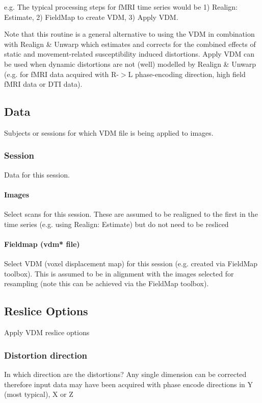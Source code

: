 e.g. The typical processing steps for fMRI time series would be 1) Realign: Estimate, 2) FieldMap to create VDM, 3) Apply VDM.

Note that this routine is a general alternative to using the VDM in combination with Realign \& Unwarp which estimates and corrects for the combined effects of static and movement-related susceptibility induced distortions. Apply VDM can be used when dynamic distortions are not (well) modelled by Realign \& Unwarp (e.g. for fMRI data acquired with R-$>$L phase-encoding direction, high field fMRI data or DTI data).


\subsection{Data}
Subjects or sessions for which VDM file is being applied to images.


\subsubsection{Session}
Data for this session.


\paragraph{Images}
Select scans for this session. These are assumed to be realigned to the first in the time series (e.g. using Realign: Estimate) but do not need to be resliced


\paragraph{Fieldmap (vdm* file)}
Select VDM (voxel displacement map) for this session (e.g. created via FieldMap toolbox). This is assumed to be in alignment with the images selected for resampling (note this can be achieved via the FieldMap toolbox).


\subsection{Reslice Options}
Apply VDM reslice options


\subsubsection{Distortion direction}
In which direction are the distortions? Any single dimension can be corrected therefore input data may have been acquired with phase encode directions in Y (most typical), X or Z


